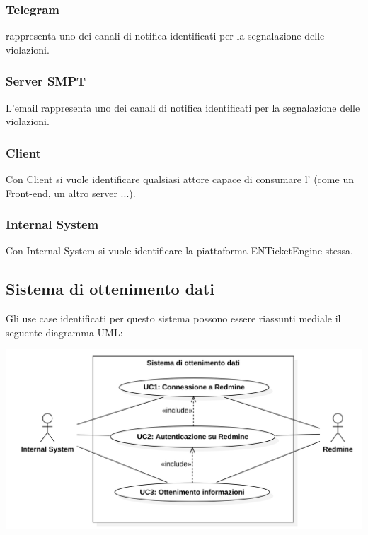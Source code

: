 \subsubsection{Telegram}
 rappresenta uno dei canali di notifica identificati per la segnalazione delle violazioni.
\subsubsection{Server SMPT}
L'email rappresenta uno dei canali di notifica identificati per la segnalazione delle violazioni.
\subsubsection{Client}
Con Client si vuole identificare qualsiasi attore capace di consumare l'  (come un Front-end, un altro server ...).
\subsubsection{Internal System}
Con Internal System si vuole identificare la piattaforma ENTicketEngine stessa.


\subsection{Sistema di ottenimento dati}
Gli use case identificati per questo sistema possono essere riassunti mediale il seguente diagramma UML:
\begin{center}
	\includegraphics[keepaspectratio = true, width=15cm]{immagini/uc/1.png}
\end{center}
